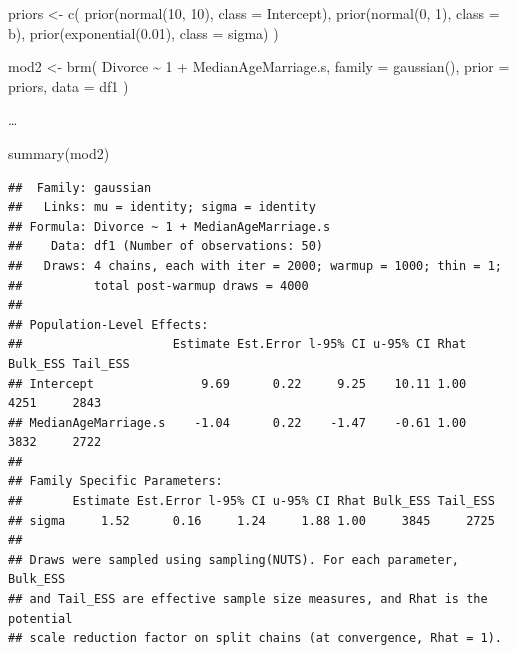 \documentclass[
  a4paper,11pt,twoside,onecolumn,openright,final,oldfontcommands]{memoir}
\newenvironment{Shaded}{\begin{snugshade}}{\end{snugshade}}
\newcommand{\AttributeTok}[1]{\textcolor[rgb]{0.77,0.63,0.00}{#1}}
\newcommand{\DecValTok}[1]{\textcolor[rgb]{0.00,0.00,0.81}{#1}}
\newcommand{\FloatTok}[1]{\textcolor[rgb]{0.00,0.00,0.81}{#1}}
\newcommand{\FunctionTok}[1]{\textcolor[rgb]{0.00,0.00,0.00}{#1}}
\newcommand{\NormalTok}[1]{#1}
\newcommand{\OtherTok}[1]{\textcolor[rgb]{0.56,0.35,0.01}{#1}}
\newcommand{\SpecialCharTok}[1]{\textcolor[rgb]{0.00,0.00,0.00}{#1}}
\theoremstyle{definition}
\theoremstyle{definition}
\theoremstyle{definition}
\theoremstyle{definition}
\theoremstyle{remark}
\begin{document}
\begin{Shaded}
\begin{Highlighting}[]
\NormalTok{priors }\OtherTok{\textless{}{-}} \FunctionTok{c}\NormalTok{(}
  \FunctionTok{prior}\NormalTok{(}\FunctionTok{normal}\NormalTok{(}\DecValTok{10}\NormalTok{, }\DecValTok{10}\NormalTok{), }\AttributeTok{class =}\NormalTok{ Intercept),}
  \FunctionTok{prior}\NormalTok{(}\FunctionTok{normal}\NormalTok{(}\DecValTok{0}\NormalTok{, }\DecValTok{1}\NormalTok{), }\AttributeTok{class =}\NormalTok{ b),}
  \FunctionTok{prior}\NormalTok{(}\FunctionTok{exponential}\NormalTok{(}\FloatTok{0.01}\NormalTok{), }\AttributeTok{class =}\NormalTok{ sigma)}
\NormalTok{  )}

\NormalTok{mod2 }\OtherTok{\textless{}{-}} \FunctionTok{brm}\NormalTok{(}
\NormalTok{  Divorce }\SpecialCharTok{\textasciitilde{}} \DecValTok{1} \SpecialCharTok{+}\NormalTok{ MedianAgeMarriage.s,}
  \AttributeTok{family =} \FunctionTok{gaussian}\NormalTok{(),}
  \AttributeTok{prior =}\NormalTok{ priors,}
  \AttributeTok{data =}\NormalTok{ df1}
\NormalTok{  )}
\end{Highlighting}
\end{Shaded}

\ldots{}

\begin{Shaded}
\begin{Highlighting}[]
\FunctionTok{summary}\NormalTok{(mod2)}
\end{Highlighting}
\end{Shaded}

\begin{verbatim}
##  Family: gaussian 
##   Links: mu = identity; sigma = identity 
## Formula: Divorce ~ 1 + MedianAgeMarriage.s 
##    Data: df1 (Number of observations: 50) 
##   Draws: 4 chains, each with iter = 2000; warmup = 1000; thin = 1;
##          total post-warmup draws = 4000
## 
## Population-Level Effects: 
##                     Estimate Est.Error l-95% CI u-95% CI Rhat Bulk_ESS Tail_ESS
## Intercept               9.69      0.22     9.25    10.11 1.00     4251     2843
## MedianAgeMarriage.s    -1.04      0.22    -1.47    -0.61 1.00     3832     2722
## 
## Family Specific Parameters: 
##       Estimate Est.Error l-95% CI u-95% CI Rhat Bulk_ESS Tail_ESS
## sigma     1.52      0.16     1.24     1.88 1.00     3845     2725
## 
## Draws were sampled using sampling(NUTS). For each parameter, Bulk_ESS
## and Tail_ESS are effective sample size measures, and Rhat is the potential
## scale reduction factor on split chains (at convergence, Rhat = 1).
\end{verbatim}
\end{document}
